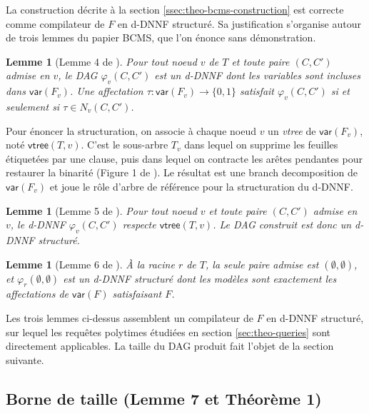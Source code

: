 \documentclass[11pt,a4paper]{report}
\theoremstyle{plain}
\newtheorem{lemma}[theorem]{Lemme}
\theoremstyle{definition}
\begin{document}
La construction décrite à la
section \ref{ssec:theo-bcms-construction} est correcte comme
compilateur de $F$ en d-DNNF structuré. Sa justification s'organise
autour de trois lemmes du papier BCMS, que l'on énonce sans
démonstration.

\begin{lemma}[Lemme 4 de \cite{bova2015}]
\label{lem:bcms-correctness}
Pour tout noeud $v$ de $T$ et toute paire $(C, C')$ admise en $v$, le
DAG $\varphi_v(C, C')$ est un d-DNNF dont les variables sont incluses
dans $\mathsf{var}(F_v)$. Une affectation
$\tau : \mathsf{var}(F_v) \to \{0,1\}$ satisfait $\varphi_v(C, C')$ si
et seulement si $\tau \in N_v(C, C')$.
\end{lemma}

Pour énoncer la structuration, on associe à chaque noeud $v$ un
\emph{vtree} de $\mathsf{var}(F_v)$, noté $\mathsf{vtree}(T, v)$. C'est
le sous-arbre $T_v$ dans lequel on supprime les feuilles étiquetées
par une clause, puis dans lequel on contracte les arêtes pendantes
pour restaurer la binarité (Figure 1 de \cite{bova2015}). Le résultat
est une branch decomposition de $\mathsf{var}(F_v)$ et joue le rôle
d'arbre de référence pour la structuration du d-DNNF.

\begin{lemma}[Lemme 5 de \cite{bova2015}]
\label{lem:bcms-structured}
Pour tout noeud $v$ et toute paire $(C, C')$ admise en $v$, le d-DNNF
$\varphi_v(C, C')$ respecte $\mathsf{vtree}(T, v)$. Le DAG construit
est donc un d-DNNF structuré.
\end{lemma}

\begin{lemma}[Lemme 6 de \cite{bova2015}]
\label{lem:bcms-root}
À la racine $r$ de $T$, la seule paire admise est
$(\emptyset, \emptyset)$, et $\varphi_r(\emptyset, \emptyset)$ est un
d-DNNF structuré dont les modèles sont exactement les affectations de
$\mathsf{var}(F)$ satisfaisant $F$.
\end{lemma}

Les trois lemmes ci-dessus assemblent un compilateur de $F$ en d-DNNF
structuré, sur lequel les requêtes polytimes étudiées en
section \ref{sec:theo-queries} sont directement applicables. La taille
du DAG produit fait l'objet de la section suivante.

\subsection{Borne de taille (Lemme 7 et Théorème 1)}
\label{ssec:theo-bcms-bound}
\end{document}
